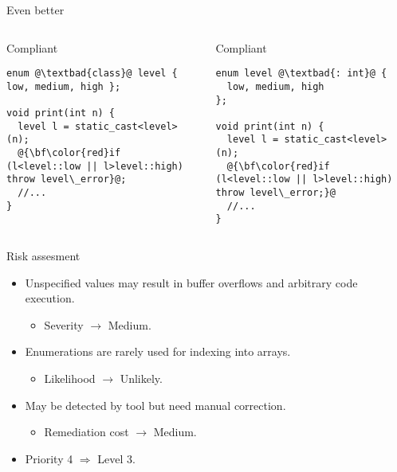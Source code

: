 \begin{frame}[t,fragile]{Even better}
\begin{columns}

\begin{block}{Compliant}
\begin{lstlisting}[escapechar=@]
enum @\textbad{class}@ level { low, medium, high };

void print(int n) {
  level l = static_cast<level>(n);
  @{\bf\color{red}if (l<level::low || l>level::high) throw level\_error}@;
  //...
}
\end{lstlisting}
\end{block}

\pause
{}
\begin{block}{Compliant}
\begin{lstlisting}[escapechar=@]
enum level @\textbad{: int}@ { 
  low, medium, high 
};

void print(int n) {
  level l = static_cast<level>(n);
  @{\bf\color{red}if (l<level::low || l>level::high) throw level\_error;}@
  //...
}
\end{lstlisting}
\end{block}

\end{columns}
\end{frame}

\begin{frame}[t]{Risk assesment}
\begin{itemize}
  \item Unspecified values may result in buffer overflows and arbitrary code execution.
    \begin{itemize}
      \item Severity $\rightarrow$ Medium.
    \end{itemize}

  \vfill
  \item Enumerations are rarely used for indexing into arrays.
    \begin{itemize}
      \item Likelihood $\rightarrow$ Unlikely.
    \end{itemize}

  \vfill
  \item May be detected by tool but need manual correction.
    \begin{itemize}
      \item Remediation cost $\rightarrow$ Medium.
    \end{itemize}

  \vfill
  \item Priority 4 $\Rightarrow$ Level 3.
\end{itemize}
\end{frame}
